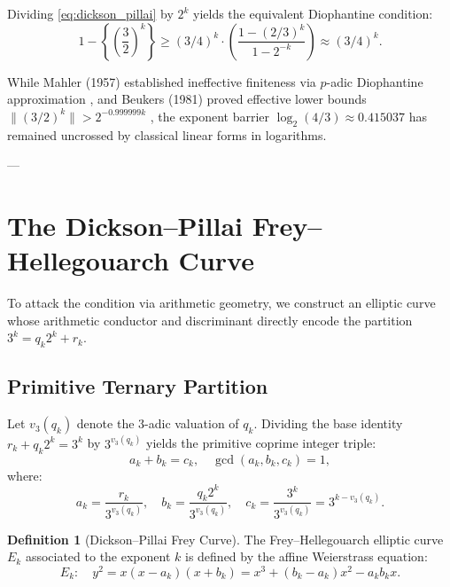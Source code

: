 \documentclass[11pt,reqno]{amsart}
\theoremstyle{definition}
\newtheorem{definition}[theorem]{Definition}
\numberwithin{equation}{section}
\begin{document}
Dividing \eqref{eq:dickson_pillai} by $2^k$ yields the equivalent Diophantine condition:
\begin{equation}\label{eq:frac_condition}
1 - \left\{ \left(\frac{3}{2}\right)^k \right\} \ge (3/4)^k \cdot \left(\frac{1 - (2/3)^k}{1 - 2^{-k}}\right) \approx (3/4)^k.
\end{equation}

While Mahler (1957) established ineffective finiteness via $p$-adic Diophantine approximation \cite{mahler1957}, and Beukers (1981) proved effective lower bounds $\|(3/2)^k\| > 2^{-0.999999 k}$ \cite{beukers1981}, the exponent barrier $\log_2(4/3) \approx 0.415037$ has remained uncrossed by classical linear forms in logarithms.

---

\section{The Dickson--Pillai Frey--Hellegouarch Curve}

To attack the condition via arithmetic geometry, we construct an elliptic curve whose arithmetic conductor and discriminant directly encode the partition $3^k = q_k 2^k + r_k$.

\subsection{Primitive Ternary Partition}
Let $v_3(q_k)$ denote the 3-adic valuation of $q_k$. Dividing the base identity $r_k + q_k 2^k = 3^k$ by $3^{v_3(q_k)}$ yields the primitive coprime integer triple:
\begin{equation}\label{eq:primitive_partition}
a_k + b_k = c_k, \quad \gcd(a_k, b_k, c_k) = 1,
\end{equation}
where:
\begin{equation}
a_k = \frac{r_k}{3^{v_3(q_k)}}, \quad b_k = \frac{q_k 2^k}{3^{v_3(q_k)}}, \quad c_k = \frac{3^k}{3^{v_3(q_k)}} = 3^{k - v_3(q_k)}.
\end{equation}

\begin{definition}[Dickson--Pillai Frey Curve]
The Frey--Hellegouarch elliptic curve $E_k$ associated to the exponent $k$ is defined by the affine Weierstrass equation:
\begin{equation}\label{eq:frey_curve}
E_k : \quad y^2 = x (x - a_k) (x + b_k) = x^3 + (b_k - a_k) x^2 - a_k b_k x.
\end{equation}
\end{definition}
\end{document}
